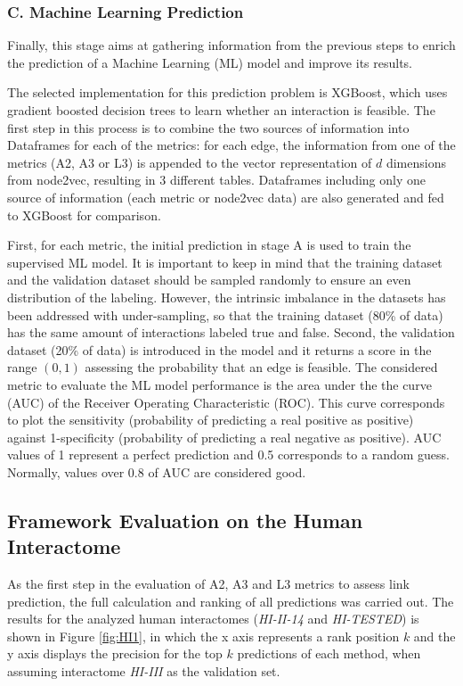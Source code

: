 \subsubsection*{C. Machine Learning Prediction}
Finally, this stage aims at gathering information from the previous steps to 
enrich the prediction of a Machine Learning (ML) model and improve its results. 

The selected implementation for this prediction problem is XGBoost, which 
uses gradient boosted decision trees to learn whether an interaction is feasible. 
The first step in this process is to combine the two sources of information into 
Dataframes for each of the metrics: for each edge, the information from one of the 
metrics (A2, A3 or L3) is appended to the vector representation of $d$ dimensions 
from node2vec, resulting in 3 different tables. Dataframes including only one 
source of information (each metric or node2vec data) are also generated and 
fed to XGBoost for comparison.

First, for each metric, the initial prediction in stage A is used to train the 
supervised ML model. It is important to keep in mind that the training dataset 
and the validation dataset should be sampled randomly to ensure an even
distribution of the labeling. However, the intrinsic imbalance in the
datasets has been addressed with under-sampling, so that the training 
dataset (80\% of data) has the same amount of interactions labeled true and false. 
Second, the validation dataset (20\% of data) is introduced in the model and it returns 
a score in the range $(0,1)$ assessing the probability that an edge is feasible. 
The considered metric to evaluate the ML model performance is the area under the 
the curve (AUC) of the Receiver Operating Characteristic (ROC). This curve
corresponds to plot the sensitivity (probability of predicting a real
positive as positive) against 1-specificity (probability of predicting
a real negative as positive). AUC values of 1 represent a perfect
prediction and 0.5 corresponds to a random guess. Normally, values
over 0.8 of AUC are considered good.


\subsection*{Framework Evaluation on the Human Interactome}

As the first step in the evaluation of A2, A3 and L3 metrics to assess link
prediction, the full calculation and ranking of all predictions was
carried out. The results for the analyzed human interactomes (\emph{HI-II-14}
and \emph{HI-TESTED}) is shown in Figure \ref{fig:HI1}, in which
the x axis represents a rank position $k$ and the y axis displays
the precision for the top $k$ predictions of each method, when assuming
interactome \emph{HI-III} as the validation set. 
	
